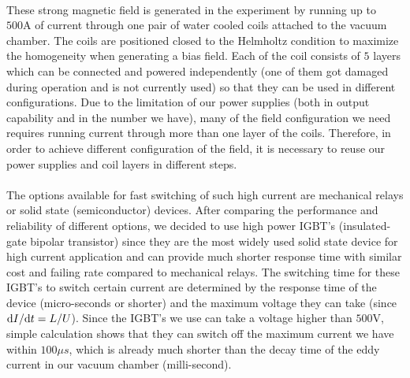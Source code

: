 \\
These strong magnetic field is generated in the experiment by running up to $500\text{A}$ of current through one pair of water cooled coils attached to the vacuum chamber. The coils are positioned closed to the Helmholtz condition to maximize the homogeneity when generating a bias field. Each of the coil consists of $5$ layers which can be connected and powered independently (one of them got damaged during operation and is not currently used) so that they can be used in different configurations. Due to the limitation of our power supplies (both in output capability and in the number we have), many of the field configuration we need requires running current through more than one layer of the coils. Therefore, in order to achieve different configuration of the field, it is necessary to reuse our power supplies and coil layers in different steps.\\
\\
The options available for fast switching of such high current are mechanical relays or solid state (semiconductor) devices. After comparing the performance and reliability of different options, we decided to use high power IGBT's (insulated-gate bipolar transistor) since they are the most widely used solid state device for high current application and can provide much shorter response time with similar cost and failing rate compared to mechanical relays. The switching time for these IGBT's to switch certain current are determined by the response time of the device (micro-seconds or shorter) and the maximum voltage they can take (since $\mathrm{d} I/\mathrm{d} t=L/U$). Since the IGBT's we use can take a voltage higher than $500\text{V}$, simple calculation shows that they can switch off the maximum current we have within $100\mu s$, which is already much shorter than the decay time of the eddy current in our vacuum chamber (milli-second).\\
\\
